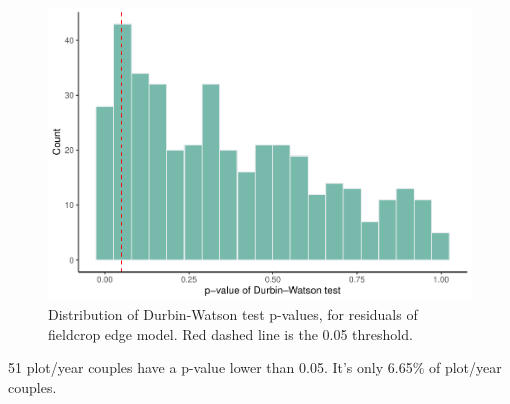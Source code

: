 \documentclass[smallextended]{svjour3}       %
\begin{document}
\begin{figure}[H]
\includegraphics[width=1\linewidth]{solitary_bees_files/figure-latex/autocor} \caption{Distribution of Durbin-Watson test p-values, for residuals of fieldcrop edge model. Red dashed line is the 0.05 threshold.}\label{fig:DW}
\end{figure}

51 plot/year couples have a p-value lower than 0.05. It's only 6.65\% of
plot/year couples.




\end{document}

